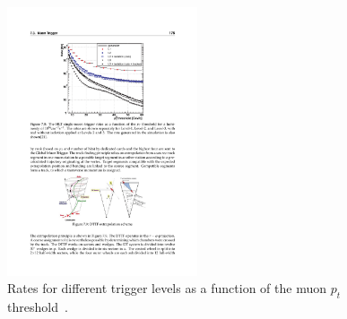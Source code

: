 \begin{figure}[htbp]
\centering
\includegraphics[width=0.5\textwidth]{Figures/pooth/pt_threshold.pdf}
\caption{Rates for different trigger levels as a function of the muon $p_t$ threshold~\cite{pt_threshold}.}
\label{fig:pt_threshold}
\end{figure}

